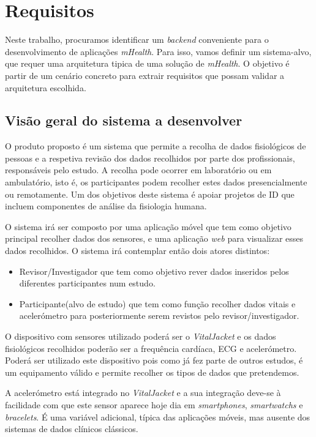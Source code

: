 \chapter{Requisitos}
Neste trabalho, procuramos identificar um \textit{backend} conveniente para o desenvolvimento de aplicações \textit{mHealth}. Para isso, vamos definir um sistema-alvo, que requer uma arquitetura tipica de uma solução de \textit{mHealth}. O objetivo é partir de um cenário concreto para extrair requisitos que possam validar a arquitetura escolhida.
\section{Visão geral do sistema a desenvolver}
O produto proposto é um sistema que permite a recolha de dados fisiológicos de pessoas e a respetiva revisão dos dados recolhidos por parte dos profissionais, responsáveis pelo estudo. A recolha pode ocorrer em laboratório ou em ambulatório, isto é, os participantes podem recolher estes dados presencialmente ou remotamente. Um dos objetivos deste sistema é apoiar projetos de \gls{ID} que incluem componentes de análise da fisiologia humana.
\par 
O sistema irá ser composto por uma aplicação móvel que tem como objetivo principal recolher dados dos sensores, e uma aplicação \textit{web} para visualizar esses dados recolhidos. O sistema irá contemplar então dois atores distintos:
\begin{itemize}
  \item Revisor/Investigador que tem como objetivo rever dados inseridos pelos diferentes participantes num estudo.
  \item Participante(alvo de estudo) que tem como função recolher dados vitais e acelerómetro para posteriormente serem revistos pelo revisor/investigador.
\end{itemize}

O dispositivo com sensores utilizado poderá ser o \textit{VitalJacket} \cite{vj} e os dados fisiológicos recolhidos poderão ser a frequência cardíaca, \gls{ECG} e acelerómetro. Poderá ser utilizado este dispositivo pois como já fez parte de outros estudos, é um equipamento válido e permite recolher os tipos de dados que pretendemos. \par 
A acelerómetro está integrado no \textit{VitalJacket} e a sua integração deve-se à facilidade com que este sensor aparece hoje dia em \textit{smartphones}, \textit{smartwatchs} e \textit{bracelets}. É uma variável adicional, típica das aplicações móveis, mas ausente dos sistemas de dados clínicos clássicos.  
\newpage
